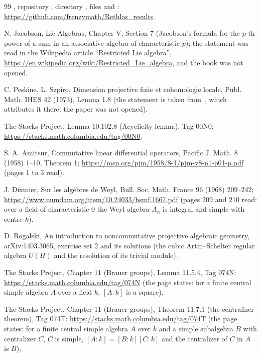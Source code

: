 \documentclass[11pt]{article}
\theoremstyle{definition}
\theoremstyle{remark}
\begin{document}
\begin{thebibliography}{99}
 , repository , directory , files  and : \url{https://github.com/frenzymath/Rethlas_results}.

 N. Jacobson, Lie Algebras, Chapter V, Section 7 (Jacobson's formula for the $p$-th power of a sum in an associative algebra of characteristic $p$); the statement was read in the Wikipedia article ``Restricted Lie algebra'', \url{https://en.wikipedia.org/wiki/Restricted_Lie_algebra}, and the book was not opened.

 C. Peskine, L. Szpiro, Dimension projective finie et cohomologie locale, Publ. Math. IHES 42 (1973), Lemma 1.8 (the statement is taken from~\cite{Stacks}, which attributes it there; the paper was not opened).

 The Stacks Project, Lemma 10.102.8 (Acyclicity lemma), Tag 00N0: \url{https://stacks.math.columbia.edu/tag/00N0}.

 S. A. Amitsur, Commutative linear differential operators, Pacific J. Math. 8 (1958) 1--10, Theorem 1; \url{https://msp.org/pjm/1958/8-1/pjm-v8-n1-p01-p.pdf} (pages 1 to 3 read).

 J. Dixmier, Sur les alg\`ebres de Weyl, Bull. Soc. Math. France 96 (1968) 209--242; \url{https://www.numdam.org/item/10.24033/bsmf.1667.pdf} (pages 209 and 210 read: over a field of characteristic $0$ the Weyl algebra $A_n$ is integral and simple with centre $k$).

 D. Rogalski, An introduction to noncommutative projective algebraic geometry, arXiv:1403.3065, exercise set 2 and its solutions (the cubic Artin--Schelter regular algebra $U(H)$ and the resolution of its trivial module).

 The Stacks Project, Chapter 11 (Brauer groups), Lemma 11.5.4, Tag 074N: \url{https://stacks.math.columbia.edu/tag/074N} (the page states: for a finite central simple algebra $A$ over a field $k$, $[A:k]$ is a square).

 The Stacks Project, Chapter 11 (Brauer groups), Theorem 11.7.1 (the centralizer theorem), Tag 074T: \url{https://stacks.math.columbia.edu/tag/074T} (the page states: for a finite central simple algebra $A$ over $k$ and a simple subalgebra $B$ with centralizer $C$, $C$ is simple, $[A:k]=[B:k][C:k]$ and the centralizer of $C$ in $A$ is $B$).


\end{thebibliography}
\end{document}
